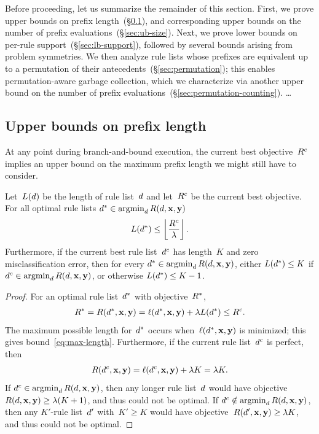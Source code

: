 Before proceeding, let us summarize the remainder of this section.
%
First, we prove upper bounds on prefix
length~(\S\ref{sec:ub-prefix-length}),
and corresponding upper bounds on the number of
prefix evaluations~(\S\ref{sec:ub-size}).
%
Next, we prove lower bounds on per-rule support~(\S\ref{sec:lb-support}),
followed by several bounds arising from problem symmetries.
%
We then analyze rule lists whose prefixes are equivalent up to
a permutation of their antecedents~(\S\ref{sec:permutation});
this enables permutation-aware garbage collection, which we
characterize via another upper bound on the number of prefix evaluations~(\S\ref{sec:permutation-counting}).
%
\dots

\subsection{Upper bounds on prefix length}
\label{sec:ub-prefix-length}

At any point during branch-and-bound execution, the current best objective~${R^c}$
implies an upper bound on the maximum prefix length we might still have to consider.

\begin{theorem}
\label{thm:ub-prefix-length}
Let~$L({d})$ be the length of rule list~${d}$
and let~${R^c}$ be the current best objective.
For all optimal rule lists ${d^* \in \operatorname*{argmin}_{d} R({d}, \mathbf{x}, \mathbf{y})}$
\begin{align}
L(\OptimalRL) \le \left\lfloor \frac{\CurrentObj}{\Reg} \right\rfloor.
\label{eq:max-length}
\end{align}
Furthermore, if the current best rule list~$d^c$
has length~$K$ and zero misclassification error,
then for every ${d^* \in \operatorname*{argmin}_{d} R({d}, \mathbf{x}, \mathbf{y})}$,
either ${L(d^*) \le K}$ if ${d^c \in \operatorname*{argmin}_d R({d}, \mathbf{x}, \mathbf{y})}$,
or otherwise ${L(d^*) \le K - 1}$.
\end{theorem}

\begin{proof}
For an optimal rule list~$d^*$ with objective~$R^*$,
\begin{align}
\OptimalObj = \Obj(\OptimalRL, \x, \y)
= \Loss(\OptimalRL, \x, \y) + \Reg L(\OptimalRL)
\le \CurrentObj.
\end{align}
The maximum possible length for~$d^*$ occurs
when~$\ell(d^*, \mathbf{x}, \mathbf{y})$ is minimized;
this gives bound~\eqref{eq:max-length}.
%
Furthermore, if the current rule list~$d^c$ is perfect, then
\begin{align}
\Obj(\CurrentRL, \x, \y) = \Loss(\CurrentRL, \x, \y) + \Reg K = \Reg K.
\end{align}
If ${d^c \in \operatorname*{argmin}_{d} R({d}, \mathbf{x}, \mathbf{y})}$, then any longer rule list~${d}$
would have objective~${R({d}, \mathbf{x}, \mathbf{y}) \ge {\lambda} (K+1)}$,
and thus could not be optimal.
%
If ${d^c \notin \operatorname*{argmin}_{d} R({d}, \mathbf{x}, \mathbf{y})}$, then any $K'$-rule list~${d}'$
with~${K' \ge K}$ would have objective~${R({d}', \mathbf{x}, \mathbf{y}) \ge {\lambda} K}$,
and thus could not be optimal.
\end{proof}


